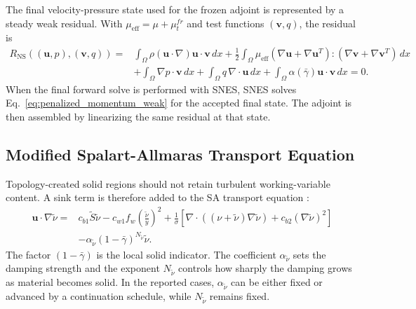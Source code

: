 The final velocity-pressure state used for the frozen adjoint is represented by a steady weak residual. With $\mu_{\mathrm{eff}}=\mu+\mu_t^{fr}$ and test functions $(\mathbf{v},q)$, the residual is
\begin{equation}
	\begin{aligned}
		R_{\mathrm{NS}}((\mathbf{u},p),(\mathbf{v},q)) =
		&\int_\Omega \rho(\mathbf{u}\cdot\nabla)\mathbf{u}\cdot\mathbf{v}\,dx
		+\frac{1}{2}\int_\Omega \mu_{\mathrm{eff}}
		\left(\nabla\mathbf{u}+\nabla\mathbf{u}^{T}\right):
		\left(\nabla\mathbf{v}+\nabla\mathbf{v}^{T}\right)\,dx \\
		&+\int_\Omega \nabla p\cdot\mathbf{v}\,dx
		+\int_\Omega q\,\nabla\cdot\mathbf{u}\,dx
		+\int_\Omega \alpha(\bar{\gamma})\mathbf{u}\cdot\mathbf{v}\,dx
		=0 .
	\end{aligned}
	\label{eq:penalized_momentum_weak}
\end{equation}
When the final forward solve is performed with SNES, SNES solves Eq.~\ref{eq:penalized_momentum_weak} for the accepted final state. The adjoint is then assembled by linearizing the same residual at that state.

\subsection{Modified Spalart-Allmaras Transport Equation}
Topology-created solid regions should not retain turbulent working-variable content. A sink term is therefore added to the SA transport equation \cite{Yoon2016,Dilgen2018}:
\begin{equation}
	\begin{aligned}
	\mathbf{u} \cdot \nabla \tilde{\nu} ={}& c_{b1} \tilde{S} \tilde{\nu}
	- c_{w1} f_w \left( \frac{\tilde{\nu}}{y} \right)^2
	+ \frac{1}{\sigma} \left[
	\nabla \cdot \left( (\nu+\tilde{\nu}) \nabla \tilde{\nu} \right)
	+ c_{b2}(\nabla\tilde{\nu})^2
	\right] \\
	&-\alpha_{\tilde{\nu}}(1-\bar{\gamma})^{N_{\tilde{\nu}}}\tilde{\nu}.
	\end{aligned}
	\label{eq:penalized_sa}
\end{equation}
The factor $(1-\bar{\gamma})$ is the local solid indicator. The coefficient $\alpha_{\tilde{\nu}}$ sets the damping strength and the exponent $N_{\tilde{\nu}}$ controls how sharply the damping grows as material becomes solid. In the reported cases, $\alpha_{\tilde{\nu}}$ can be either fixed or advanced by a continuation schedule, while $N_{\tilde{\nu}}$ remains fixed.

